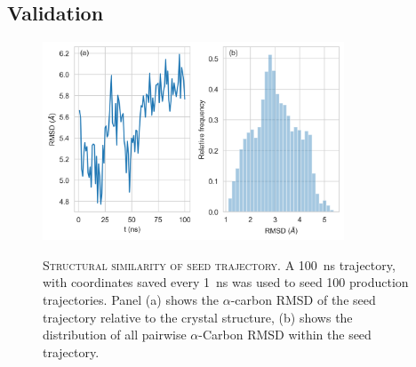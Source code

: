 \subsection{Validation}\label{sec:aadh_validation}

\begin{figure}
    \centering
    \caption[Structural similarity of seed trajectory]{\textsc{Structural similarity of seed trajectory}. A \SI{100}{\nano\second} trajectory, with coordinates saved every \SI{1}{\nano\second} was used to seed \num{100} production trajectories.  Panel (a) shows the $\alpha$-carbon RMSD of the seed trajectory relative to the crystal structure, (b) shows the distribution of all pairwise $\alpha$-Carbon RMSD within the seed trajectory. }
    \includegraphics[width=0.8\textwidth]{chapters/aadh/figures/rmsd_seed_trajectory.png}
    \label{fig:rmsd_seed_traj}
\end{figure}
